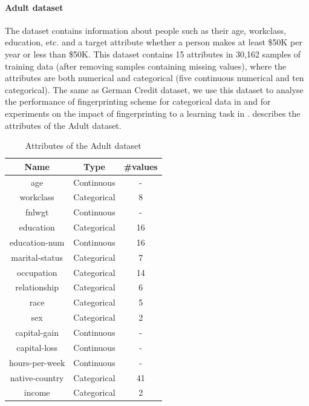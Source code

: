 \paragraph{Adult dataset}
The dataset contains information about people such as their age, workclass, education, etc. and a target attribute whether a person makes at least \$50K per year or less than \$50K.
This dataset contains 15 attributes in 30,162 samples of training data (after removing samples containing missing values), where the attributes are both numerical and categorical (five continuous numerical and ten categorical). 
The same as German Credit dataset, we use this dataset to analyse the performance of fingerprinting scheme for categorical data in  and for experiments on the impact of fingerprinting to a learning task in .  describes the attributes of the Adult dataset.

\begin{table}[ht]
    \centering
    \caption{Attributes of the Adult dataset}
    \label{tab:adult_attributes}
    \begin{tabular}{|c|c|c|}
    \hline
         Name & Type & \#values \\
         \hline
         age & Continuous & - \\
         \hline
         workclass & Categorical & 8 \\
         \hline
         fnlwgt & Continuous & -\\
         \hline
         education & Categorical & 16 \\
         \hline
         education-num & Continuous & 16 \\
         \hline
         marital-status & Categorical & 7 \\
         \hline
         occupation & Categorical & 14 \\
         \hline
         relationship & Categorical & 6 \\
         \hline
         race & Categorical & 5 \\
         \hline
         sex & Categorical & 2 \\
         \hline
         capital-gain & Continuous & - \\
         \hline
         capital-loss & Continuous & - \\
         \hline
         hours-per-week & Continuous & - \\
         \hline
         native-country & Categorical & 41 \\
         \hline
         income & Categorical & 2 \\
         \hline
    \end{tabular}
\end{table}

